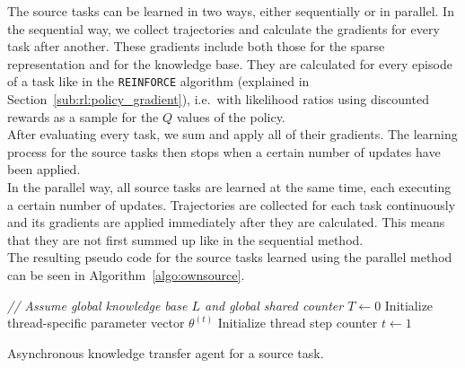 The source tasks can be learned in two ways, either sequentially or in parallel.
In the sequential way, we collect trajectories and calculate the gradients for every task after another.
These gradients include both those for the sparse representation and for the knowledge base.
They are calculated for every episode of a task like in the \texttt{REINFORCE} algorithm (explained in Section~\ref{sub:rl:policy_gradient}), i.e.\ with likelihood ratios using discounted rewards as a sample for the $Q$ values of the policy.\\
After evaluating every task, we sum and apply all of their gradients.
The learning process for the source tasks then stops when a certain number of updates have been applied.\\
In the parallel way, all source tasks are learned at the same time, each executing a certain number of updates.
Trajectories are collected for each task continuously and its gradients are applied immediately after they are calculated.
This means that they are not first summed up like in the sequential method.\\
The resulting pseudo code for the source tasks learned using the parallel method can be seen in Algorithm~\ref{algo:ownsource}.\\
\begin{algorithm}[htb]
\DontPrintSemicolon
\emph{// Assume global knowledge base $L$ and global shared counter $T \gets 0$}\;
Initialize thread-specific parameter vector $\theta^{(t)}$\;
Initialize thread step counter $t\gets 1$\;
\caption[Asynchronous knowledge transfer agent for a source task]{Asynchronous knowledge transfer agent for a source task.}
\label{algo:ownsource}
\end{algorithm}

